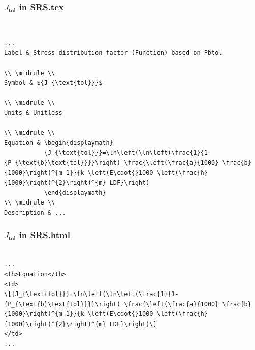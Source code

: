 \documentclass{beamer}
\begin{document}

\begin{frame}

\frametitle{$J_{\mbox{tol}}$ in SRS.tex}
~\\
\begin{lstlisting}
...
Label & Stress distribution factor (Function) based on Pbtol
        
\\ \midrule \\
Symbol & ${J_{\text{tol}}}$
         
\\ \midrule \\
Units & Unitless
        
\\ \midrule \\
Equation & \begin{displaymath}
           {J_{\text{tol}}}=\ln\left(\ln\left(\frac{1}{1-{P_{\text{b}\text{tol}}}}\right) \frac{\left(\frac{a}{1000} \frac{b}{1000}\right)^{m-1}}{k \left(E\cdot{}1000 \left(\frac{h}{1000}\right)^{2}\right)^{m} LDF}\right)
           \end{displaymath}
\\ \midrule \\
Description & ...
\end{lstlisting}
\end{frame}


\begin{frame}

\frametitle{$J_{\mbox{tol}}$ in SRS.html}

\begin{lstlisting}

...
<th>Equation</th>
<td>
\[{J_{\text{tol}}}=\ln\left(\ln\left(\frac{1}{1-{P_{\text{b}\text{tol}}}}\right) \frac{\left(\frac{a}{1000} \frac{b}{1000}\right)^{m-1}}{k \left(E\cdot{}1000 \left(\frac{h}{1000}\right)^{2}\right)^{m} LDF}\right)\]
</td>
...
\end{lstlisting}

\end{frame}
\end{document}
